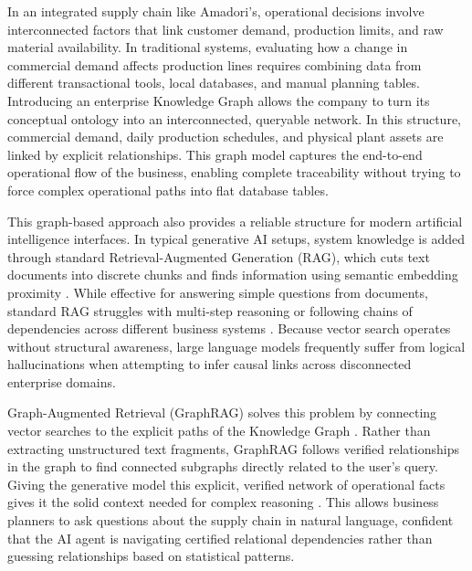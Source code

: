 In an integrated supply chain like Amadori's, operational decisions involve interconnected factors that link customer demand, production limits, and raw material availability. 
In traditional systems, evaluating how a change in commercial demand affects production lines requires combining data from different transactional tools, local databases, 
and manual planning tables. Introducing an enterprise Knowledge Graph allows the company to turn its conceptual ontology into an interconnected, queryable network. 
In this structure, commercial demand, daily production schedules, and physical plant assets are linked by explicit relationships. 
This graph model captures the end-to-end operational flow of the business, enabling complete traceability without trying to force complex operational paths into flat database tables.

This graph-based approach also provides a reliable structure for modern artificial intelligence interfaces. 
In typical generative AI setups, system knowledge is added through standard Retrieval-Augmented Generation (RAG), which cuts text documents into discrete chunks and finds 
information using semantic embedding proximity \cite{lewis2020retrieval}. While effective for answering simple questions from documents, standard RAG struggles 
with multi-step reasoning or following chains of dependencies across different business systems \cite{edge2024local}. 
Because vector search operates without structural awareness, large language models frequently suffer from logical hallucinations when attempting to infer causal links 
across disconnected enterprise domains.

Graph-Augmented Retrieval (GraphRAG) solves this problem by connecting vector searches to the explicit paths of the Knowledge Graph \cite{edge2024local, hogan2021knowledge}. 
Rather than extracting unstructured text fragments, GraphRAG follows verified relationships in the graph to find connected subgraphs directly related to the user's query. 
Giving the generative model this explicit, verified network of operational facts gives it the solid context needed for complex reasoning \cite{hilger2026bridging}. 
This allows business planners to ask questions about the supply chain in natural language, confident that the AI agent is navigating certified relational dependencies rather than 
guessing relationships based on statistical patterns.


